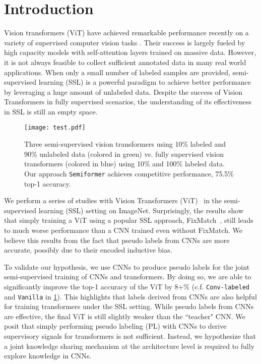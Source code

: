 \documentclass[runningheads]{llncs}
\makeatletter
\newcommand*{\system}{\texttt{Semiformer}\@\xspace}
\newcommand*{\vanilla}{\texttt{Vanilla}\@\xspace}
\newcommand*{\convl}{\texttt{Conv-labeled}\@\xspace}
\makeatother
\begin{document}
\section{Introduction}


Vision transformers (ViT) have achieved remarkable performance recently on a variety of supervised computer vision tasks \cite{dosovitskiy2020image,heo2021rethinking,liu2021swin}. Their success is largely fueled by high capacity models with self-attention layers trained on massive data. However, it is not always feasible to collect sufficient annotated data in many real world applications. 
When only a small number of labeled samples are provided, semi-supervised learning (SSL) \cite{zhu2005semi,chapelle2009semi} is a powerful paradigm to achieve better performance by leveraging a huge amount of unlabeled data. Despite the success of Vision Transformers in fully supervised scenarios, the understanding of its effectiveness in SSL is still an empty space.


\begin{figure}[t!]
\centering
  \texttt{[image: test.pdf]}
  \caption{Three semi-supervised vision transformers using 10\% labeled and 90\% unlabeled data (colored in green) vs. fully supervised vision transformers (colored in blue) using 10\% and 100\% labeled data. Our  approach {\system} achieves competitive performance, 75.5\% top-1 accuracy.} 
\label{fig:CTcompare}
\end{figure}


We perform a series of studies with Vision Transformers (ViT)~\cite{dosovitskiy2020image} in the semi-supervised learning (SSL) setting on ImageNet. Surprisingly, the results show that simply training a ViT using a popular SSL approach, FixMatch~\cite{sohn2020fixmatch}, still leads to much worse performance than a CNN trained even without FixMatch. We believe this results from the fact that pseudo labels from CNNs are more accurate, possibly due to their encoded inductive bias.

To validate our hypothesis, we use CNNs to produce pseudo labels for the joint semi-supervised training of CNNs and transformers.
By doing so, we are able to significantly improve the top-1 accuracy of the ViT by 8+\% (c.f. \convl and \vanilla in \cref{fig:CTcompare}). This highlights that labels derived from CNNs are also helpful for training transformers under the SSL setting. While pseudo labels from CNNs are effective, the final ViT is still slightly weaker than the ``teacher" CNN.
We posit that simply performing pseudo labeling (PL) with CNNs to derive supervisory signals for transformers is not sufficient. Instead, we hypothesize that a joint knowledge sharing mechanism at the architecture level is required to fully explore knowledge in CNNs. 
\end{document}
